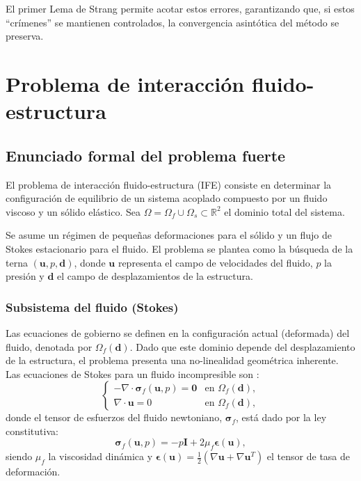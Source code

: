 \documentclass[12pt, letterpaper]{report}
\theoremstyle{definition}
\begin{document}
El primer Lema de Strang permite acotar estos errores, garantizando que, si estos ``crímenes'' se mantienen controlados, la convergencia asintótica del método se preserva.

\chapter{Problema de interacción fluido-estructura}
\label{chap:modelo}

\section{Enunciado formal del problema fuerte}

El problema de interacción fluido-estructura (IFE) consiste en determinar la configuración de equilibrio de un sistema acoplado compuesto por un fluido viscoso y un sólido elástico. Sea $\Omega = \Omega_f \cup \Omega_s \subset \mathbb{R}^2$ el dominio total del sistema.

Se asume un régimen de pequeñas deformaciones para el sólido y un flujo de Stokes estacionario para el fluido. El problema se plantea como la búsqueda de la terna $(\mathbf{u}, p, \mathbf{d})$, donde $\mathbf{u}$ representa el campo de velocidades del fluido, $p$ la presión y $\mathbf{d}$ el campo de desplazamientos de la estructura.

\subsection{Subsistema del fluido (Stokes)}

Las ecuaciones de gobierno se definen en la configuración actual (deformada) del fluido, denotada por $\Omega_f(\mathbf{d})$. Dado que este dominio depende del desplazamiento de la estructura, el problema presenta una no-linealidad geométrica inherente. Las ecuaciones de Stokes para un fluido incompresible son \cite{girault1986finite}:
\begin{equation} \label{eq:strong_stokes}
    \begin{cases}
        -\nabla \cdot \boldsymbol{\sigma}_f(\mathbf{u}, p) = \mathbf{0} & \text{en } \Omega_f(\mathbf{d}), \\
        \nabla \cdot \mathbf{u} = 0 & \text{en } \Omega_f(\mathbf{d}),
    \end{cases}
\end{equation}
donde el tensor de esfuerzos del fluido newtoniano, $\boldsymbol{\sigma}_f$, está dado por la ley constitutiva:
\[
\boldsymbol{\sigma}_f(\mathbf{u}, p) = -p \mathbf{I} + 2\mu_f \boldsymbol{\epsilon}(\mathbf{u}),
\]
siendo $\mu_f$ la viscosidad dinámica y $\boldsymbol{\epsilon}(\mathbf{u}) = \frac{1}{2}(\nabla \mathbf{u} + \nabla \mathbf{u}^T)$ el tensor de tasa de deformación.
\end{document}
